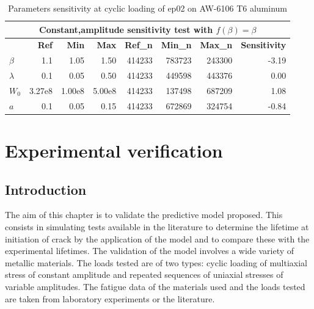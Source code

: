 \documentclass[3p,times,number,review]{elsarticle}
\begin{document}
\begin{table}[!h]
	\centering
	\begin{tabular}{lrrrrrrr}
		\hline
		\multicolumn{8}{c}{\textbf{Constant,amplitude sensitivity test with $f(\beta)=\beta$}}                                                                                                                                                                                                                                           \\ \hline
		& \multicolumn{1}{r}{\textbf{Ref}} & \multicolumn{1}{r}{\textbf{Min}} & \multicolumn{1}{r}{\textbf{Max}} & \multicolumn{1}{r}{\textbf{Ref\_n}} & \multicolumn{1}{r}{\textbf{Min\_n}} & \multicolumn{1}{r}{\textbf{Max\_n}} & \multicolumn{1}{r}{\textbf{Sensitivity}} \\ \hline
		\textbf{$\beta$}   & 1.1                                          & 1.05                             & 1.50                             & 414233                                     & 
		783723 	                              & 243300 
		&-3.19 
		\\
		\textbf{$\lambda$} & 0.1                                          & 0.05                             & 0.50                             & 414233                                    & 449598 
		& 443376 
		& 0.00                                    \\
		\textbf{$W_0$}     & 3.27e8                                     & 1.00e8                         & 5.00e8                         & 414233                                     & 137498 
		& 687209 
		& 1.08                                    \\
		\textbf{$a$}       & 0.1                                          & 0.05                             & 0.15                             & 414233                                  & 672869 
		& 324754 
		& -0.84                                   \\ \hline
	\end{tabular}
	\caption{Parameters sensitivity at cyclic loading of ep02 on AW-6106 T6 aluminum}
	\label{tab.sensitivity_const1}
\end{table}

\clearpage
\section{Experimental verification}

\subsection{Introduction}
The aim of this chapter is to validate the predictive model proposed. This consists in simulating tests available in the literature to determine the lifetime at initiation of crack by the application of the model and to compare these with the experimental lifetimes. The validation of the model involves a wide variety of metallic materials. The loads tested are of two types: cyclic loading of multiaxial stress of constant amplitude and repeated sequences of uniaxial stresses of variable amplitudes. The fatigue data of the materials used and the loads tested are taken from laboratory experiments or the literature.
\end{document}
